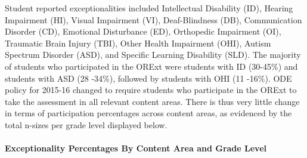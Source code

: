 \documentclass[]{article}
\let\oldparagraph\paragraph
\renewcommand{\paragraph}[1]{\oldparagraph{#1}\mbox{}}
\begin{document}
Student reported exceptionalities included Intellectual Disability (ID),
Hearing Impairment (HI), Visual Impairment (VI), Deaf-Blindness (DB),
Communication Disorder (CD), Emotional Disturbance (ED), Orthopedic
Impairment (OI), Traumatic Brain Injury (TBI), Other Health Impairment
(OHI), Autism Spectrum Disorder (ASD), and Specific Learning Disability
(SLD). The majority of students who participated in the ORExt were
students with ID (30-45\%) and students with ASD (28 -34\%), followed by
students with OHI (11 -16\%). ODE policy for 2015-16 changed to require
students who participate in the ORExt to take the assessment in all
relevant content areas. There is thus very little change in terms of
participation percentages across content areas, as evidenced by the
total n-sizes per grade level displayed below.

\clearpage

\paragraph{Exceptionality Percentages By Content Area and Grade
Level}\label{exceptionality-percentages-by-content-area-and-grade-level}
\end{document}
